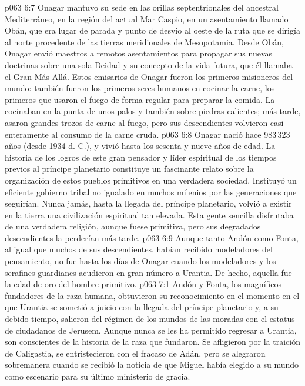 \vs p063 6:7 \pc Onagar mantuvo su sede en las orillas septentrionales del ancestral Mediterráneo, en la región del actual Mar Caspio, en un asentamiento llamado Obán, que era lugar de parada y punto de desvío al oeste de la ruta que se dirigía al norte procedente de las tierras meridionales de Mesopotamia. Desde Obán, Onagar envió maestros a remotos asentamientos para propagar sus nuevas doctrinas sobre una sola Deidad y su concepto de la vida futura, que él llamaba el Gran Más Allá. Estos emisarios de Onagar fueron los primeros misioneros del mundo: también fueron los primeros seres humanos en cocinar la carne, los primeros que usaron el fuego de forma regular para preparar la comida. La cocinaban en la punta de unos palos y también sobre piedras calientes; más tarde, asaron grandes trozos de carne al fuego, pero sus descendientes volvieron casi enteramente al consumo de la carne cruda.
\vs p063 6:8 Onagar nació hace 983\,323 años (desde 1934 d. C.), y vivió hasta los sesenta y nueve años de edad. La historia de los logros de este gran pensador y líder espiritual de los tiempos previos al príncipe planetario constituye un fascinante relato sobre la organización de estos pueblos primitivos en una verdadera sociedad. Instituyó un eficiente gobierno tribal no igualado en muchos milenios por las generaciones que seguirían. Nunca jamás, hasta la llegada del príncipe planetario, volvió a existir en la tierra una civilización espiritual tan elevada. Esta gente sencilla disfrutaba de una verdadera religión, aunque fuese primitiva, pero sus degradados descendientes la perderían más tarde.
\vs p063 6:9 Aunque tanto Andón como Fonta, al igual que muchos de sus descendientes, habían recibido modeladores del pensamiento, no fue hasta los días de Onagar cuando los modeladores y los serafines guardianes acudieron en gran número a Urantia. De hecho, aquella fue la edad de oro del hombre primitivo.
\vs p063 7:1 Andón y Fonta, los magníficos fundadores de la raza humana, obtuvieron su reconocimiento en el momento en el que Urantia se sometió a juicio con la llegada del príncipe planetario y, a su debido tiempo, salieron del régimen de los mundos de las moradas con el estatus de ciudadanos de Jerusem. Aunque nunca se les ha permitido regresar a Urantia, son conscientes de la historia de la raza que fundaron. Se afligieron por la traición de Caligastia, se entristecieron con el fracaso de Adán, pero se alegraron sobremanera cuando se recibió la noticia de que Miguel había elegido a su mundo como escenario para su último ministerio de gracia.
